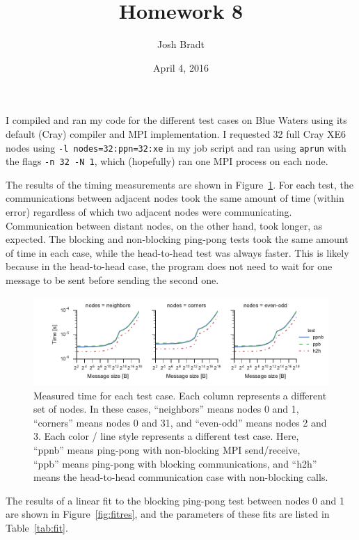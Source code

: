 \documentclass{article}
\title{Homework 8}
\author{Josh Bradt}
\date{April 4, 2016}
\begin{document}
\maketitle

I compiled and ran my code for the different test cases on Blue Waters using its default (Cray) compiler and MPI implementation. I requested 32 full Cray XE6 nodes using \texttt{-l nodes=32:ppn=32:xe} in my job script and ran using \texttt{aprun} with the flags \texttt{-n 32 -N 1}, which (hopefully) ran one MPI process on each node.

The results of the timing measurements are shown in Figure~\ref{fig:res}. For each test, the communications between adjacent nodes took the same amount of time (within error) regardless of which two adjacent nodes were communicating. Communication between distant nodes, on the other hand, took longer, as expected. The blocking and non-blocking ping-pong tests took the same amount of time in each case, while the head-to-head test was always faster. This is likely because in the head-to-head case, the program does not need to wait for one message to be sent before sending the second one.

\begin{figure}
    \centering
    \includegraphics[width=\textwidth]{databynodes.pdf}
    \caption{Measured time for each test case. Each column represents a different set of nodes. In these cases, ``neighbors'' means nodes 0 and 1, ``corners'' means nodes 0 and 31, and ``even-odd'' means nodes 2 and 3. Each color / line style represents a different test case. Here, ``ppnb'' means ping-pong with non-blocking MPI send/receive, ``ppb'' means ping-pong with blocking communications, and ``h2h'' means the head-to-head communication case with non-blocking calls.}
    \label{fig:res}
\end{figure}

The results of a linear fit to the blocking ping-pong test between nodes 0 and 1 are shown in Figure~\ref{fig:fitres}, and the parameters of these fits are listed in Table~\ref{tab:fit}.
\end{document}
